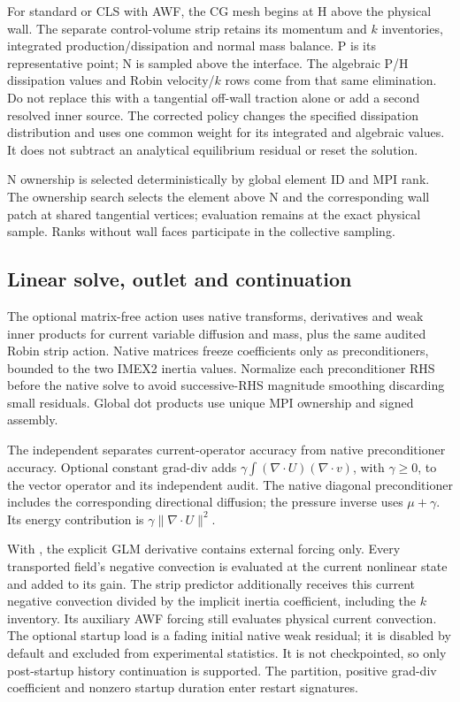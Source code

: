 For standard or CLS with AWF, the CG mesh begins at H above the physical wall. The separate
control-volume strip retains its momentum and $k$ inventories, integrated
production/dissipation and normal mass balance. P is its representative point;
N is sampled above the interface. The algebraic P/H dissipation values and
Robin velocity/$k$ rows come from that same elimination. Do not replace this
with a tangential off-wall traction alone or add a second resolved inner source.
The corrected policy changes the specified dissipation distribution and uses
one common weight for its integrated and algebraic values. It does not subtract
an analytical equilibrium residual or reset the solution.

N ownership is selected deterministically by global element ID and MPI rank.
The ownership search selects the element above N and the corresponding wall
patch at shared tangential vertices; evaluation remains at the exact physical
sample. Ranks without wall faces participate in the collective sampling.

\subsection{Linear solve, outlet and continuation}

The optional matrix-free action uses native transforms, derivatives and weak
inner products for current variable diffusion and mass, plus the same audited
Robin strip action. Native matrices freeze coefficients only as preconditioners,
bounded to the two IMEX2 inertia values. Normalize each preconditioner RHS before
the native solve to avoid successive-RHS magnitude smoothing discarding small
residuals. Global dot products use unique MPI ownership and signed assembly.

The independent  separates current-operator
accuracy from native preconditioner accuracy. Optional constant grad-div adds
$\gamma\int(\nabla\cdot U)(\nabla\cdot v)$, with $\gamma\ge0$, to the vector
operator and its independent audit. The native diagonal preconditioner includes
the corresponding directional diffusion; the pressure inverse uses
$\mu+\gamma$. Its energy contribution is $\gamma\|\nabla\cdot U\|^2$.

With , the explicit GLM derivative
contains external forcing only. Every transported field's negative convection
is evaluated at the current nonlinear state and added to its gain. The strip
predictor additionally receives this current negative convection divided by
the implicit inertia coefficient, including the $k$ inventory. Its auxiliary
AWF forcing still evaluates physical current convection. The optional startup
load is a fading initial native weak residual; it is disabled by default and
excluded from experimental statistics. It is not checkpointed, so only
post-startup history continuation is supported. The partition, positive
grad-div coefficient and nonzero startup duration enter restart signatures.

